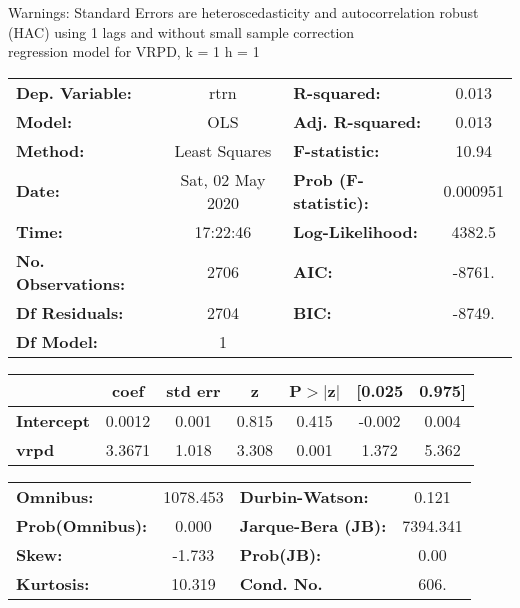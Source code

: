 Warnings: \newline
 [1] Standard Errors are heteroscedasticity and autocorrelation robust (HAC) using 1 lags and without small sample correction\\ 

regression model for VRPD, k = 1 h = 1\begin{center}
\begin{tabular}{lclc}
\toprule
\textbf{Dep. Variable:}    &       rtrn       & \textbf{  R-squared:         } &     0.013   \\
\textbf{Model:}            &       OLS        & \textbf{  Adj. R-squared:    } &     0.013   \\
\textbf{Method:}           &  Least Squares   & \textbf{  F-statistic:       } &     10.94   \\
\textbf{Date:}             & Sat, 02 May 2020 & \textbf{  Prob (F-statistic):} &  0.000951   \\
\textbf{Time:}             &     17:22:46     & \textbf{  Log-Likelihood:    } &    4382.5   \\
\textbf{No. Observations:} &        2706      & \textbf{  AIC:               } &    -8761.   \\
\textbf{Df Residuals:}     &        2704      & \textbf{  BIC:               } &    -8749.   \\
\textbf{Df Model:}         &           1      & \textbf{                     } &             \\
\bottomrule
\end{tabular}
\begin{tabular}{lcccccc}
                   & \textbf{coef} & \textbf{std err} & \textbf{z} & \textbf{P$> |$z$|$} & \textbf{[0.025} & \textbf{0.975]}  \\
\midrule
\textbf{Intercept} &       0.0012  &        0.001     &     0.815  &         0.415        &       -0.002    &        0.004     \\
\textbf{vrpd}      &       3.3671  &        1.018     &     3.308  &         0.001        &        1.372    &        5.362     \\
\bottomrule
\end{tabular}
\begin{tabular}{lclc}
\textbf{Omnibus:}       & 1078.453 & \textbf{  Durbin-Watson:     } &    0.121  \\
\textbf{Prob(Omnibus):} &   0.000  & \textbf{  Jarque-Bera (JB):  } & 7394.341  \\
\textbf{Skew:}          &  -1.733  & \textbf{  Prob(JB):          } &     0.00  \\
\textbf{Kurtosis:}      &  10.319  & \textbf{  Cond. No.          } &     606.  \\
\bottomrule
\end{tabular}
\end{center}

